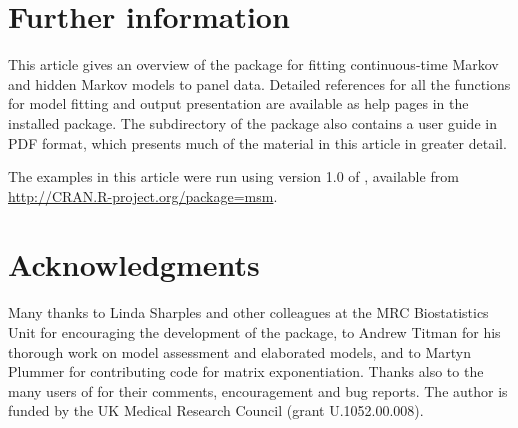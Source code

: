 \documentclass[article,shortnames]{jss}
\begin{document}
\section{Further information}

This article gives an overview of the  package for fitting
continuous-time Markov and hidden Markov models to panel data.
Detailed references for all the functions for model fitting and output
presentation are available as help pages in the installed package.
The  subdirectory of the package also contains a user guide
in PDF format, which presents much of the material in this article in
greater detail.

The examples in this article were run using version 1.0 of ,
available from \url{http://CRAN.R-project.org/package=msm}.

\section*{Acknowledgments}

Many thanks to Linda Sharples and other colleagues at the MRC
Biostatistics Unit for encouraging the development of the 
package, to Andrew Titman for his thorough work on model assessment
and elaborated models, and to Martyn Plummer for contributing code for
matrix exponentiation.  Thanks also to the many users of  for
their comments, encouragement and bug reports.  The author is funded
by the UK Medical Research Council (grant U.1052.00.008).


\end{document}
